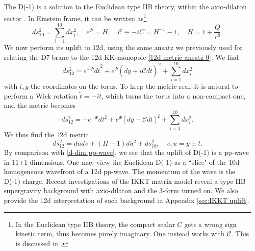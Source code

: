 The D(-1) is a solution to the Euclidean type IIB theory, within the axio-dilaton sector \cite{Gibbons:1995vg}.
In Einstein frame, it can be written as\footnote{In the Euclidean type IIB theory, the compact scalar $C$ gets a wrong sign kinetic term, thus becomes purely imaginary. One instead works with $\mathcal C$. This is discussed in \cite{Gibbons:1995vg}.}
\begin{equation}
ds_{10}^2 = \sum_{i=1}^{10} dx_i^2,\quad
e^\Phi = H, \quad
\mathcal C\equiv-iC = H^{-1}-1,\quad
H=1+\frac{Q}{r^8}.
\label{D-1 background}
\end{equation}
We now perform its uplift to 12d, using the same ansatz we previously used for relating the D7 brane to the 12d KK-monopole \eqref{12d metric ansatz 0}.
We find
\begin{equation}
ds_{12}^2=
e^{-\Phi}d\tilde{t}^2+e^\Phi(dy+i\mathcal C d\tilde{t})^2
+
 \sum_{i=1}^{10} dx_i^2
\label{F-theory ansatz}
\end{equation}
with $\tilde{t},y$ the coordinates on the torus.
To keep the metric real, it is natural to perform a Wick rotation $\tilde{t}=-it$, which turns the torus into a non-compact one, and the metric becomes
\begin{equation}
ds_{12}^2=
-e^{-\Phi}dt^2+e^\Phi[dy+\mathcal C dt]^2
+\sum_{i=1}^{10}dx_i^2.
\end{equation}
We thus find the 12d metric
\begin{equation}
ds_{12}^2
=
dudv
+(H-1)du^2
+ds_{10}^2,\quad
v,u = y\pm t.
\end{equation}
By comparison with \eqref{d-dim pp-wave}, we see that the uplift of D(-1) is a pp-wave in 11+1 dimensions.
One may view the Euclidean D(-1) as a ``slice" of the 10d homogeneous wavefront of a 12d pp-wave.
The momentum of the wave is the D(-1) charge.
Recent investigations of the IKKT matrix model \cite{Hartnoll:2024csr,Komatsu:2024bop} reveal a type IIB supergravity background with axio-dilaton and the 3-form turned on. We also provide the 12d interpretation of such background in Appendix \ref{sec:IKKT uplift}.

